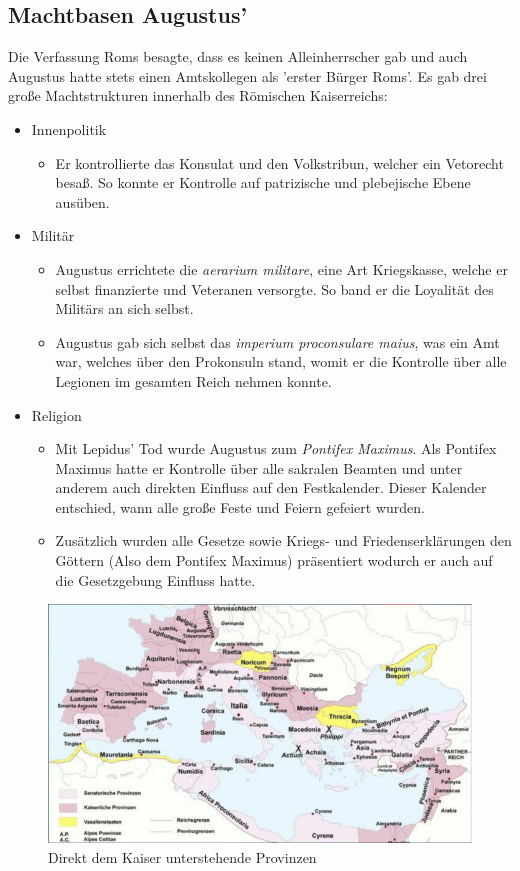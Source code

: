 \documentclass{article}
\begin{document}
	\subsection{Machtbasen Augustus'}
	Die Verfassung Roms besagte, dass es keinen Alleinherrscher gab und auch Augustus hatte stets einen Amtskollegen als 'erster Bürger Roms'. Es gab drei große Machtstrukturen innerhalb des Römischen Kaiserreichs:
	\begin{itemize}
		\item{Innenpolitik}
		\begin{itemize}
			\item{Er kontrollierte das Konsulat und den Volkstribun, welcher ein Vetorecht besaß. So konnte er Kontrolle auf patrizische und plebejische Ebene ausüben.}
		\end{itemize}
		\item{Militär}
		\begin{itemize}
			\item{Augustus errichtete die \textit{aerarium militare}, eine Art Kriegskasse, welche er selbst finanzierte und Veteranen versorgte. So band er die Loyalität des Militärs an sich selbst.}
			\item{Augustus gab sich selbst das \textit{imperium proconsulare maius}, was ein Amt war, welches über den Prokonsuln stand, womit er die Kontrolle über alle Legionen im gesamten Reich nehmen konnte.}
		\end{itemize}
		\item{Religion}
		\begin{itemize}
			\item{Mit Lepidus' Tod wurde Augustus zum \textit{Pontifex Maximus}. Als Pontifex Maximus hatte er Kontrolle über alle sakralen Beamten und unter anderem auch direkten Einfluss auf den Festkalender. Dieser Kalender entschied, wann alle große Feste und Feiern gefeiert wurden.}
			\item{Zusätzlich wurden alle Gesetze sowie Kriegs- und Friedenserklärungen den Göttern (Also dem Pontifex Maximus) präsentiert wodurch er auch auf die Gesetzgebung Einfluss hatte.}
		\end{itemize}
	\end{itemize}
	\begin{figure}
	\includegraphics{Kaiserreich_Augustus.jpg}
	\caption{Direkt dem Kaiser unterstehende Provinzen}
	\end{figure}
\end{document}
